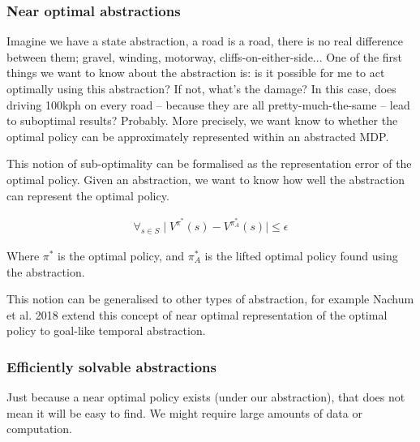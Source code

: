 \subsubsection{Near optimal abstractions}

Imagine we have a state abstraction, a road is a road, there is no real difference
between them; gravel, winding, motorway, cliffs-on-either-side...
One of the first things we want to know about the abstraction is:
is it possible for me to act optimally
using this abstraction? If not, what's the damage? In this case, does driving 100kph on every road --
because they are all pretty-much-the-same -- lead to suboptimal results? Probably.
More precisely, we want know to whether the optimal policy can be approximately represented within an abstracted MDP.

This notion of sub-optimality can be formalised as the representation error of the optimal
policy. \cite{Abel2017} Given an abstraction, we want to know how well the abstraction can represent the optimal policy.

\begin{align}
\forall_{s\in S} \mid V^{\pi^* }(s) - V^{\pi_{A}^* }(s) \mid \le \epsilon
\end{align}

Where $\pi^{* }$ is the optimal policy, and $\pi_{A}^{* }$ is the lifted optimal
policy found using the abstraction.

This notion can be generalised to other types of abstraction, for example
Nachum et al. 2018 \cite{Nachum2018} extend this concept of near optimal
representation of the optimal policy to goal-like temporal abstraction. \footnotemark[13]


\subsubsection{Efficiently solvable abstractions}

Just because a near optimal policy exists (under our abstraction), that does not mean it will be easy to find. 
We might require large amounts of data or computation.



